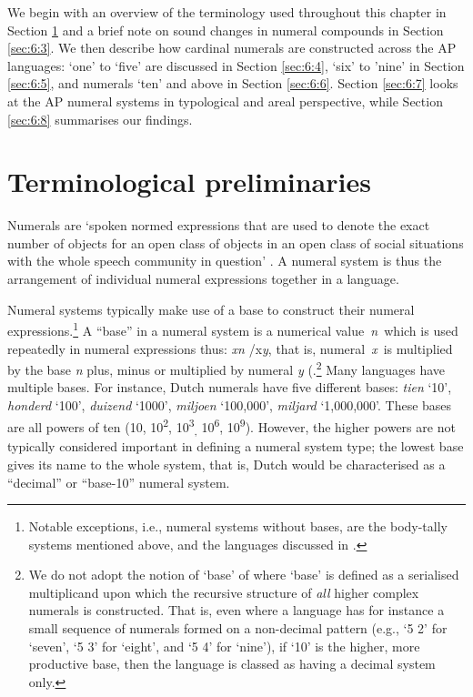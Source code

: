 \documentclass[output=paper]{LSP/langsci}
\begin{document}
We begin with an overview of the terminology used throughout this chapter in Section \ref{sec:6:2} and a brief note on sound changes in numeral compounds in Section \ref{sec:6:3}. We then describe how cardinal numerals are constructed across the AP languages: `one' to `five' are discussed in Section \ref{sec:6:4}, `six' to 'nine' in Section \ref{sec:6:5}, and numerals `ten' and above in Section \ref{sec:6:6}. Section \ref{sec:6:7} looks at the AP numeral systems in typological and areal perspective, while Section \ref{sec:6:8} summarises our findings.

\section{Terminological preliminaries}\label{sec:6:2}
Numerals are `spoken normed expressions that are used to denote the exact number of objects for an open class of objects in an open class of social situations with the whole speech community in question' \citep[11]{Hammarstrom2010}. A numeral system is thus the arrangement of individual numeral expressions together in a language.

Numeral systems typically make use of a base to construct their numeral expressions.\footnote{{}   Notable exceptions, i.e., numeral systems without bases, are the body-tally systems mentioned above, and the languages discussed in \citet[17-22]{Hammarstrom2010}.} A ``base'' in a numeral system is a numerical value~\textit{n~}which is used repeatedly in numeral expressions thus: \textit{xn {\textpm}}/x\textit{y}, that is, numeral~\textit{x}~is multiplied by the base \textit{n} plus, minus or multiplied by numeral \textit{y} (\citet{Comrie2005}\citet[15]{Hammarstrom2010}.\footnote{We do not adopt the notion of `base' of \citet{Greenberg1978} where `base' is defined as a serialised multiplicand upon which the recursive structure of \textit{all} higher complex numerals is constructed. That is, even where a language has for instance a small sequence of numerals formed on a non-decimal pattern (e.g., `5 2' for `seven', `5 3' for `eight', and `5 4' for `nine'),  if `10' is the higher, more productive base, then the language is classed as having a decimal system only.}  Many languages have multiple bases. For instance, Dutch numerals have five different bases: \textit{tien} `10', \textit{honderd} `100', \textit{duizend} `1000', \textit{miljoen} `100,000', \textit{miljard} `1,000,000'. These bases are all powers of ten (10, 10\textsuperscript{2}, 10\textsuperscript{3}\textsubscript{,} 10\textsuperscript{6}, 10\textsuperscript{9}). However, the higher powers are not typically considered important in defining a numeral system type; the lowest base gives its name to the whole system, that is, Dutch would be characterised as a ``decimal'' or ``base-10'' numeral system. 
\end{document}
